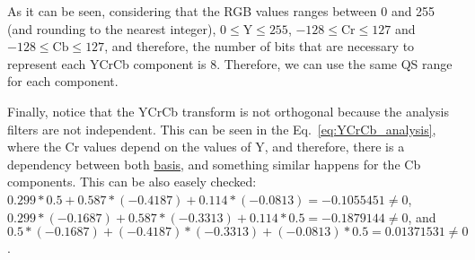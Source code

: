 As it can be seen, considering that the RGB values ranges between 0
and 255 (and rounding to the nearest integer), $0\le\text{Y}\le 255$,
$-128\le\text{Cr}\le 127$ and $-128\le\text{Cb}\le 127$, and
therefore, the number of bits that are necessary to represent each
YCrCb component is 8. Therefore, we can use the same QS range for each
component.

Finally, notice that the YCrCb transform is not orthogonal because the
analysis filters are not independent. This can be seen in the
Eq.~\ref{eq:YCrCb_analysis}, where the Cr values depend on the values
of Y, and therefore, there is a dependency between both
\href{https://en.wikipedia.org/wiki/Basis_(linear_algebra)}{basis},
and something similar happens for the Cb components. This can be also
easely checked: $0.299*0.5 + 0.587*(-0.4187) + 0.114*(-0.0813) =
-0.1055451 \neq 0$, $0.299*(-0.1687) + 0.587*(-0.3313) + 0.114*0.5 =
-0.1879144 \neq 0$, and $0.5*(-0.1687) + (-0.4187)*(-0.3313 ) +
(-0.0813)*0.5 = 0.01371531 \neq 0$.

\begin{comment}
\subsubsection{Quantization}
After analyzing the frame (representing it in the YCrCb domain), the
next natural step is quantization. Unfortunately, the RGB/YCrCb
transform is not orthogonal\footnote{The RGB/YCrCb is not orthogonal
because, for example, as we can see in the
Eq.~\ref{eq:YCrCb_analysis}, the value of Cr depends on the value of
Y, and therefore, there is a dependency between both
\href{https://en.wikipedia.org/wiki/Basis_(linear_algebra)}{basis}.}
and therefore the contribution of each channel to the quality of the
reconstructed image $\tilde{X}$ are not additive (this can be seen in
this
\href{https://github.com/Sistemas-Multimedia/Sistemas-Multimedia.github.io/blob/master/study_guide/06-color_transform/performance.ipynb}{notebook}). For
that reason, and only for the sake of simplicity, we will use
\begin{equation}
  \Delta_{\text{Y}} = \Delta_{\text{Cr}} = \Delta_{\text{Cb}}.
  \label{eq:simple_Q}
\end{equation}
\end{comment}

